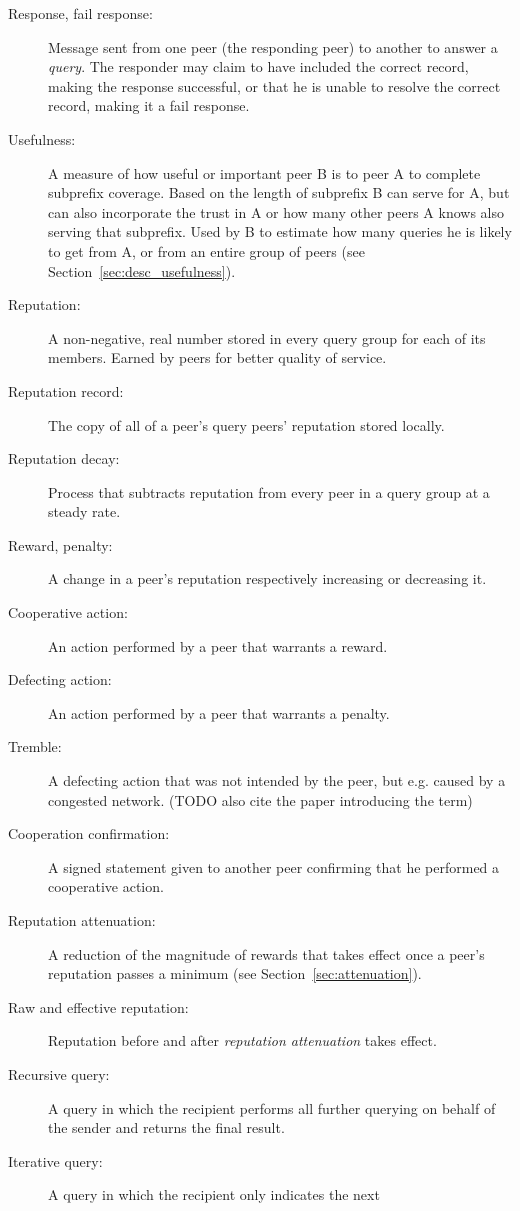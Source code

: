 \begin{description}
\item[Response, fail response:] Message sent from one peer (the responding peer)
to another to answer a \emph{query}. The responder may claim to have included
the correct record, making the response successful, or that he is unable to
resolve the correct record, making it a fail response.
\item[Usefulness:] A measure of how useful or important peer B is to peer A to
complete subprefix coverage. Based on the length of subprefix B can serve for A,
but can also incorporate the trust in A or how many other peers A knows also
serving that subprefix. Used by B to estimate how many queries he is likely to
get from A, or from an entire group of peers (see
Section~\ref{sec:desc_usefulness}).
\item[Reputation:] A non-negative, real number stored in every query group for
each of its members. Earned by peers for better quality of service.
\item[Reputation record:] The copy of all of a peer's query peers' reputation
stored locally.
\item[Reputation decay:] Process that subtracts reputation from every peer in a
query group at a steady rate.
\item[Reward, penalty:] A change in a peer's reputation respectively increasing
or decreasing it.
\item[Cooperative action:] An action performed by a peer that warrants a reward.
\item[Defecting action:] An action performed by a peer that warrants a penalty.
\item[Tremble:] A defecting action that was not intended by the peer, but e.g.
caused by a congested network. (TODO also cite the paper introducing the term)
\item[Cooperation confirmation:] A signed statement given to another peer
confirming that he performed a cooperative action.
\item[Reputation attenuation:] A reduction of the magnitude of rewards that
takes effect once a peer's reputation passes a minimum (see
Section~\ref{sec:attenuation}).
\item[Raw and effective reputation:] Reputation before and after
\emph{reputation attenuation} takes effect.
\item[Recursive query:] A query in which the recipient performs all further
querying on behalf of the sender and returns the final result.
\item[Iterative query:] A query in which the recipient only indicates the next

\end{description}
